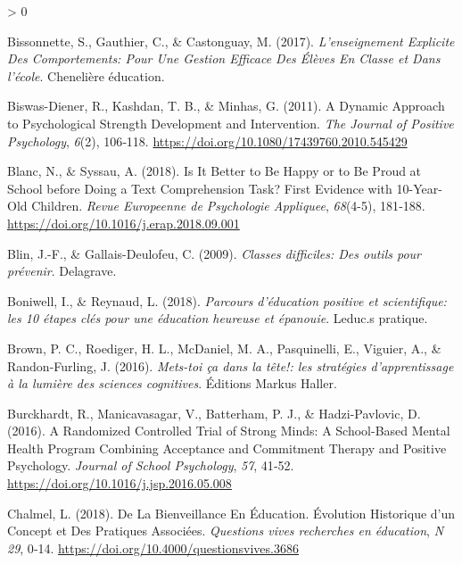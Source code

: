 \documentclass[
  french,
]{article}
\newlength{\cslhangindent}
\newenvironment{CSLReferences}[2] %
 {%
  \setlength{\parindent}{0pt}
  \ifodd #1 \everypar{\setlength{\hangindent}{\cslhangindent}}\ignorespaces\fi
  \ifnum #2 > 0
  \setlength{\parskip}{#2\baselineskip}
  \fi
 }%
 {}
\begin{document}
\hypertarget{refs}{}
\begin{CSLReferences}{1}{0}
\leavevmode\hypertarget{ref-bissonnette2017}{}%
Bissonnette, S., Gauthier, C., \& Castonguay, M. (2017). \emph{L'enseignement Explicite Des Comportements: Pour Une Gestion Efficace Des Élèves En Classe et Dans l'école}. {Chenelière éducation}.

\leavevmode\hypertarget{ref-biswas-diener2011}{}%
Biswas-Diener, R., Kashdan, T. B., \& Minhas, G. (2011). A Dynamic Approach to Psychological Strength Development and Intervention. \emph{The Journal of Positive Psychology}, \emph{6}(2), 106‑118. \url{https://doi.org/10.1080/17439760.2010.545429}

\leavevmode\hypertarget{ref-blanc2018}{}%
Blanc, N., \& Syssau, A. (2018). Is It Better to Be Happy or to Be Proud at School before Doing a Text Comprehension Task? {First} Evidence with 10-Year-Old Children. \emph{Revue Europeenne de Psychologie Appliquee}, \emph{68}(4-5), 181‑188. \url{https://doi.org/10.1016/j.erap.2018.09.001}

\leavevmode\hypertarget{ref-blin2009}{}%
Blin, J.-F., \& Gallais-Deulofeu, C. (2009). \emph{{Classes difficiles: Des outils pour prévenir}}. {Delagrave}.

\leavevmode\hypertarget{ref-boniwell2018}{}%
Boniwell, I., \& Reynaud, L. (2018). \emph{{Parcours d'éducation positive et scientifique: les 10 étapes clés pour une éducation heureuse et épanouie}}. {Leduc.s pratique}.

\leavevmode\hypertarget{ref-brown2016}{}%
Brown, P. C., Roediger, H. L., McDaniel, M. A., Pasquinelli, E., Viguier, A., \& Randon-Furling, J. (2016). \emph{{Mets-toi ça dans la tête!: les stratégies d'apprentissage à la lumière des sciences cognitives}}. {Éditions Markus Haller}.

\leavevmode\hypertarget{ref-burckhardt2016}{}%
Burckhardt, R., Manicavasagar, V., Batterham, P. J., \& Hadzi-Pavlovic, D. (2016). A Randomized Controlled Trial of Strong Minds: {A} School-Based Mental Health Program Combining Acceptance and Commitment Therapy and Positive Psychology. \emph{Journal of School Psychology}, \emph{57}, 41‑52. \url{https://doi.org/10.1016/j.jsp.2016.05.008}

\leavevmode\hypertarget{ref-chalmel2018}{}%
Chalmel, L. (2018). De La Bienveillance En Éducation. {Évolution} Historique d'un Concept et Des Pratiques Associées. \emph{Questions vives recherches en éducation}, \emph{N{} 29}, 0‑14. \url{https://doi.org/10.4000/questionsvives.3686}


\end{CSLReferences}
\end{document}
